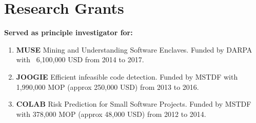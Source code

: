 \section{\sc Research Grants}

\textbf{Served as principle investigator for:}
\begin{enumerate}
  \item \textbf{MUSE} Mining and Understanding Software Enclaves. Funded by
  DARPA with ~6,100,000 USD from 2014 to 2017.
  \item \textbf{JOOGIE} Efficient infeasible code detection. Funded by MSTDF
  with 1,990,000 MOP (approx 250,000 USD) from 2013 to 2016. 
  \item \textbf{COLAB} Risk Prediction for Small Software Projects. Funded by
  MSTDF with 378,000 MOP (approx 48,000 USD) from 2012 to 2014.
\end{enumerate}

